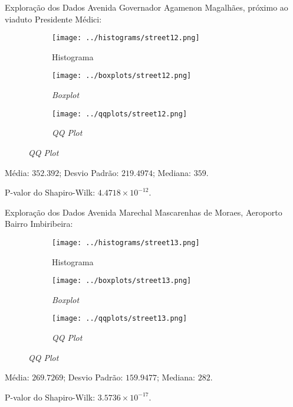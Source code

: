 \begin{frame}{Exploração dos Dados}
Avenida Governador Agamenon Magalhães, próximo ao viaduto Presidente Médici:
\begin{figure}
	\centering
	\begin{subfigure}{.33\textwidth}
		\centering
		\texttt{[image: ../histograms/street12.png]}
		\caption*{Histograma}
	\end{subfigure}%
	\begin{subfigure}{.33\textwidth}
		\centering
		\texttt{[image: ../boxplots/street12.png]}
		\caption*{\textit{Boxplot}}
	\end{subfigure}
	\begin{subfigure}{.32\textwidth}
		\centering
		\texttt{[image: ../qqplots/street12.png]}
		\caption*{\textit{QQ Plot}}
	\end{subfigure}
\end{figure}
Média: $352.392$; Desvio Padrão: $219.4974$; Mediana: $359$.

P-valor do Shapiro-Wilk: $4.4718 \times 10^{-12}$.
\end{frame}

\begin{frame}{Exploração dos Dados}
Avenida Marechal Mascarenhas de Moraes, Aeroporto Bairro Imbiribeira:
\begin{figure}
	\centering
	\begin{subfigure}{.33\textwidth}
		\centering
		\texttt{[image: ../histograms/street13.png]}
		\caption*{Histograma}
	\end{subfigure}%
	\begin{subfigure}{.33\textwidth}
		\centering
		\texttt{[image: ../boxplots/street13.png]}
		\caption*{\textit{Boxplot}}
	\end{subfigure}
	\begin{subfigure}{.32\textwidth}
		\centering
		\texttt{[image: ../qqplots/street13.png]}
		\caption*{\textit{QQ Plot}}
	\end{subfigure}
\end{figure}
Média: $269.7269$; Desvio Padrão: $159.9477$; Mediana: $282$.

P-valor do Shapiro-Wilk: $3.5736 \times 10^{-17}$.
\end{frame}

